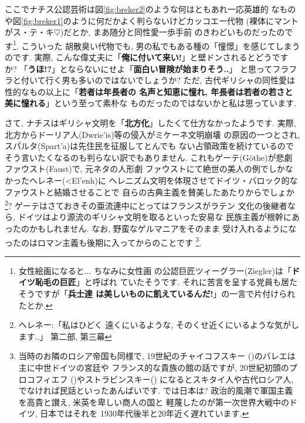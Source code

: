 \documentclass[b5j,8pt,twocolumn]{ltjsarticle}
\newcommand{\textgreek}[1]{\begingroup\fontencoding{LGR}\selectfont#1\endgroup}
\begin{document}
ここでナチス公認芸術は図\ref{fig:breker2}のような何はともあれ一応英雄的
なものや図\ref{fig:breker1}のように何だかよく判らないけどカッコエー代物
(裸体にマントがス・テ・キ$\heartsuit$)だとか, まあ随分と同性愛一歩手前
のきわどいものだったのです\footnote{女性絵画になると... ちなみに女性画
の公認巨匠ツィーグラー(Ziegler)は「\textbf{ドイツ恥毛の巨匠}」と呼ばれ
ていたそうです. それに苦言を呈する党員も居たそうですが「\textbf{兵士達
は美しいものに飢えているんだ!}」の一言で片付けられたとか.}. こういった
胡散臭い代物でも, 男の私でもある種の「憧憬」を感じてしまうのです. 実際,
 こんな偉丈夫に「\textbf{俺に付いて来い!}」と壁ドンされるとどうですか?
 「\textbf{うほ!?}」とならないにせよ「\textbf{面白い冒険が始まりそう..}」
と思ってフラフラと付いて行く男も多いのではないでしょうか?
 ただ, 古代ギリシャの同性愛は性的なもの以上に「\textbf{若者は年長者の
名声と知恵に憧れ, 年長者は若者の若さと美に憧れる}」という至って素朴な
ものだったのではないかと私は思っています.
\newline

さて, ナチスはギリシャ文明を「\textbf{北方化}」したくて仕方なかったようです.
 実際, 北方からドーリア人(\textgreek{Dwrie'is})等の侵入がミケーネ文明崩壊
の原因の一つとされ, スパルタ(\textgreek{Spart'a})は先住民を征服してとんでも
ない占領政策を続けているのでそう言いたくなるのも判らない訳でもありません.
 これもゲーテ(G\"othe)が悲劇ファウスト(Faust)\cite{ゲーテ}で, 元ネタの人形劇
ファウストにて絶世の美人の例でしかなかったヘレネー(\textgreek{<El'enh})に
ヘレニズム文明を体現させてドイツ・バロック的なファウストと結婚させることで
自らの古典主義を賛美したあたりからでしょか\footnote{ヘレネー:「私はひどく
遠くにいるような, そのくせ近くにいるような気がします..」\cite{ゲーテ}
第二部, 第三幕}?  ゲーテはさておきその亜流連中にとってはフランスがラテン
文化の後継者なら, ドイツはより源流のギリシャ文明を取るといった安易な
民族主義が根幹にあったのかもしれません. なお, 野蛮なゲルマニアをそのまま
受け入れるようになったのはロマン主義も後期に入ってからのことです
\footnote{当時のお隣のロシア帝国も同様で, 19世紀のチャイコフスキー
({})のバレエは主に中世ドイツの宮廷や
フランス的な貴族の館の話ですが, 20世紀初頭のプロコフィエフ
({})やストラビンスキー({})
になるとスキタイ人や古代ロシア人, でなければ民話といったあんばいです.
 では日本は? 政治的風潮で軍国主義を高貴と讃え, 米英を卑しい商人の国と
軽蔑したのが第一次世界大戦中のドイツ\cite{クラウス}, 日本ではそれを
1930年代後半と20年近く遅れています.}.
\newline
\end{document}
